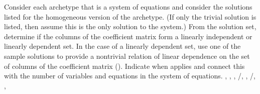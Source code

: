 Consider each archetype that is a system of equations and consider the solutions listed for the homogeneous version of the archetype.  (If only the trivial solution is listed, then assume this is the only solution to the system.)  From the solution set, determine if the columns of the coefficient matrix form a linearly independent or linearly dependent set.  In the case of a linearly dependent set, use one of the sample solutions to provide a nontrivial relation of linear dependence on the set of columns of the coefficient matrix ().  Indicate when  applies and connect this with the number of variables and equations in the system of equations.\newline\newline
{},
,
,
/,
,
/,
,

